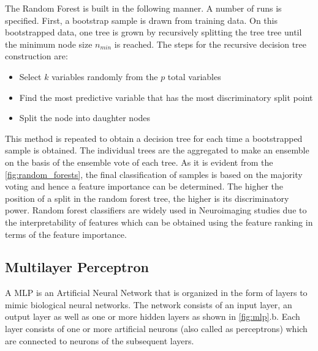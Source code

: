 \documentclass[msthesis.tex]{subfiles}
\begin{document}
The Random Forest is built in the following manner. A number of runs is specified. First, a bootstrap sample is drawn from training data. On this bootstrapped data, one tree is grown by recursively splitting the tree tree until the minimum node size $n_{min}$ is reached. The steps for the recursive decision tree construction are:
\begin{itemize}
    \item Select $k$ variables randomly from the $p$ total variables
    \item Find the most predictive variable that has the most discriminatory split point
    \item Split the node into daughter nodes

\end{itemize}
This method is repeated to obtain a decision tree for each time a bootstrapped sample is obtained. The individual trees are the aggregated to make an ensemble on the basis of the ensemble vote of each tree. As it is evident from the \autoref{fig:random_forests}, the final classification of samples is based on the majority voting and hence a feature importance can be determined. The higher the position of a split in the random forest tree, the higher is its discriminatory power. Random forest classifiers are widely used in Neuroimaging studies due to the interpretability of features which can be obtained using the feature ranking in terms of the feature importance. 



\subsection{Multilayer Perceptron}
A \gls{MLP} is an Artificial Neural Network that is organized in the form of layers to mimic biological neural networks. The network consists of an input layer, an output layer as well as one or more hidden layers as shown in \autoref{fig:mlp}.b. Each layer consists of one or more artificial neurons (also called as perceptrons) which are connected to neurons of the subsequent layers. 
\end{document}
